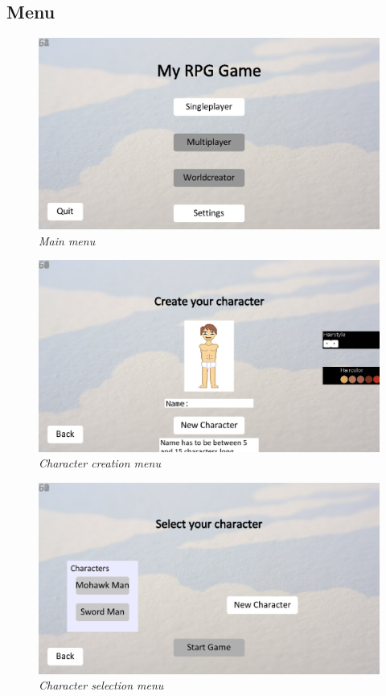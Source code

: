 \documentclass[a4paper,12pt]{article}
\begin{document}
\subsection{Menu}

\begin{figure}[H]
\includegraphics[width=\textwidth]{img/menushot1.eps}\\
\emph{%
    Main menu
}\\
\end{figure}

\vspace{10pt}
\noindent
\begin{figure}[H]
\includegraphics[width=\textwidth]{img/menushot2.eps}\\
\emph{%
    Character creation menu
}
\end{figure}

\vspace{10pt}
\noindent
\begin{figure}[H]
\includegraphics[width=\textwidth]{img/menushot3.eps}\\
\emph{%
    Character selection menu
}
\end{figure}
\end{document}

